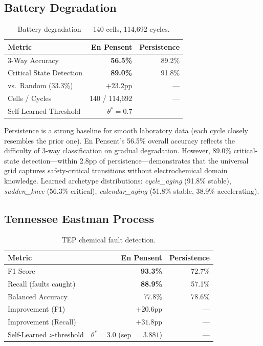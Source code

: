 \documentclass[12pt,a4paper]{article}
\begin{document}
\subsection{Battery Degradation}

\begin{table}[H]
\centering
\caption{Battery degradation — 140 cells, 114,692 cycles.}
\label{tab:battery}
\begin{tabular}{lrr}
\toprule
\textbf{Metric} & \textbf{En Pensent} & \textbf{Persistence} \\
\midrule
3-Way Accuracy & \textbf{56.5\%} & 89.2\% \\
Critical State Detection & \textbf{89.0\%} & 91.8\% \\
vs.\ Random (33.3\%) & $+23.2$pp & --- \\
Cells / Cycles & 140 / 114,692 & --- \\
Self-Learned Threshold & $\theta^* = 0.7$ & --- \\
\bottomrule
\end{tabular}
\end{table}

Persistence is a strong baseline for smooth laboratory data (each cycle closely resembles the
prior one). En Pensent's 56.5\% overall accuracy reflects the difficulty of 3-way classification
on gradual degradation. However, 89.0\% critical-state detection---within 2.8pp of
persistence---demonstrates that the universal grid captures safety-critical transitions without
electrochemical domain knowledge. Learned archetype distributions: \textit{cycle\_aging} (91.8\%
stable), \textit{sudden\_knee} (56.3\% critical), \textit{calendar\_aging} (51.8\% stable, 38.9\%
accelerating).

\subsection{Tennessee Eastman Process}

\begin{table}[H]
\centering
\caption{TEP chemical fault detection.}
\label{tab:tep}
\begin{tabular}{lrr}
\toprule
\textbf{Metric} & \textbf{En Pensent} & \textbf{Persistence} \\
\midrule
F1 Score & \textbf{93.3\%} & 72.7\% \\
Recall (faults caught) & \textbf{88.9\%} & 57.1\% \\
Balanced Accuracy & 77.8\% & 78.6\% \\
Improvement (F1) & $+20.6$pp & --- \\
Improvement (Recall) & $+31.8$pp & --- \\
Self-Learned $z$-threshold & $\theta^* = 3.0$ (sep $= 3.881$) & --- \\
\bottomrule
\end{tabular}
\end{table}
\end{document}
